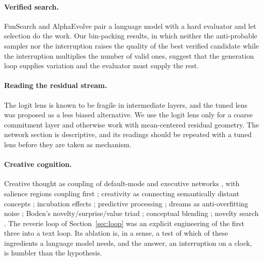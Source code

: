 \paragraph{Verified search.} FunSearch \citep{romeraparedes2024funsearch}
and AlphaEvolve \citep{novikov2025alphaevolve} pair a language model with a
hard evaluator and let selection do the work. Our bin-packing results, in
which neither the anti-probable sampler nor the interruption raises the
quality of the best verified candidate while the interruption multiplies the
number of valid ones, suggest that the generation loop supplies variation
and the evaluator must supply the rest.

\paragraph{Reading the residual stream.} The logit lens is known to be
fragile in intermediate layers, and the tuned lens \citep{belrose2023tunedlens}
was proposed as a less biased alternative. We use the logit lens only for a
coarse commitment layer and otherwise work with mean-centered residual
geometry. The network section is descriptive, and its readings should be
repeated with a tuned lens before they are taken as mechanism.

\paragraph{Creative cognition.} Creative thought as coupling of default-mode
and executive networks \citep{beaty2016dynamics}, with salience regions
coupling first \citep{beaty2018robust}; creativity as connecting semantically
distant concepts \citep{kenett2018semantic}; incubation effects
\citep{sio2009incubation}; predictive processing \citep{clark2013whatever};
dreams as anti-overfitting noise \citep{hoel2021overfitted}; Boden's
novelty/surprise/value triad \citep{boden2004creative}; conceptual blending
\citep{fauconnier2002way}; novelty search \citep{stanley2015greatness}. The
reverie loop of Section~\ref{sec:loop} was an explicit engineering of the
first three into a text loop. Its ablation is, in a sense, a test of which of
these ingredients a language model needs, and the answer, an interruption on
a clock, is humbler than the hypothesis.
